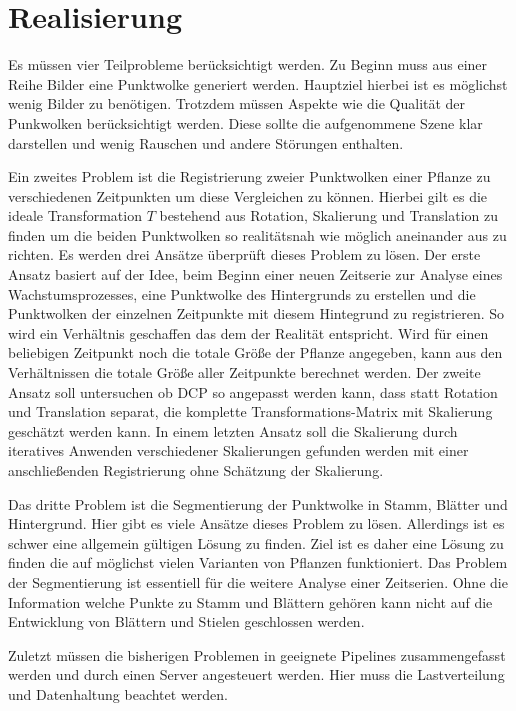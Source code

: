 \documentclass[12pt,titlepage, twoside]{article}
\begin{document}
\newpage
\section{Realisierung}
\label{sec:realisierung}
Es müssen vier Teilprobleme berücksichtigt werden. Zu Beginn muss aus einer Reihe Bilder eine Punktwolke generiert werden. Hauptziel hierbei ist es möglichst wenig Bilder zu benötigen. 
Trotzdem müssen Aspekte wie die Qualität der Punkwolken berücksichtigt werden. Diese sollte die aufgenommene Szene klar darstellen und wenig Rauschen und andere Störungen enthalten. 

Ein zweites Problem ist die Registrierung zweier Punktwolken einer Pflanze zu verschiedenen Zeitpunkten um diese Vergleichen zu können. 
Hierbei gilt es die ideale Transformation $T$ bestehend aus Rotation, Skalierung und Translation zu finden um die beiden Punktwolken so realitätsnah wie möglich aneinander aus zu richten.
Es werden drei Ansätze überprüft dieses Problem zu lösen. 
Der erste Ansatz basiert auf der Idee, beim Beginn einer neuen Zeitserie zur Analyse eines Wachstumsprozesses, eine Punktwolke des Hintergrunds zu erstellen und die Punktwolken der einzelnen Zeitpunkte mit diesem Hintegrund zu registrieren. 
So wird ein Verhältnis geschaffen das dem der Realität entspricht. Wird für einen beliebigen Zeitpunkt noch die totale Größe der Pflanze angegeben, kann aus den Verhältnissen die totale Größe aller Zeitpunkte berechnet werden. 
Der zweite Ansatz soll untersuchen ob DCP so angepasst werden kann, dass statt Rotation und Translation separat, die komplette Transformations-Matrix mit Skalierung geschätzt werden kann.
In einem letzten Ansatz soll die Skalierung durch iteratives Anwenden verschiedener Skalierungen gefunden werden mit einer anschließenden Registrierung ohne Schätzung der Skalierung.

Das dritte Problem ist die Segmentierung der Punktwolke in Stamm, Blätter und Hintergrund. Hier gibt es viele Ansätze dieses Problem zu lösen. Allerdings ist es schwer eine allgemein gültigen Lösung zu finden. 
Ziel ist es daher eine Lösung zu finden die auf möglichst vielen Varianten von Pflanzen funktioniert. 
Das Problem der Segmentierung ist essentiell für die weitere Analyse einer Zeitserien. Ohne die Information welche Punkte zu Stamm und Blättern gehören kann nicht auf die Entwicklung von Blättern und Stielen geschlossen werden.

Zuletzt müssen die bisherigen Problemen in geeignete Pipelines zusammengefasst werden und durch einen Server angesteuert werden. Hier muss die Lastverteilung und Datenhaltung beachtet werden.
\end{document}
